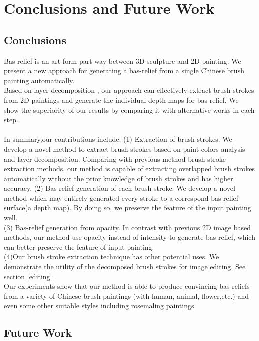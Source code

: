 \chapter{Conclusions and Future Work}
\section{Conclusions}
Bas-relief is an art form part way between 3D sculpture and 2D painting. We present a new approach for generating a bas-relief from a single Chinese brush painting automatically. \\
Based on layer decomposition , our approach can effectively extract brush strokes from 2D paintings and generate the individual depth maps for bas-relief. We show the superiority of our results by comparing it with alternative works in each step.\\ \\
In summary,our contributions include:
\newline
(1) Extraction of brush strokes. We develop a novel method to extract brush strokes based on paint colors analysis and layer decomposition.  Comparing with previous method brush stroke extraction methods, our method is capable of extracting overlapped brush strokes automatically without the prior knowledge of brush strokes and has higher accuracy. 
\newline
(2) Bas-relief generation of each brush stroke. We develop a novel method which may entirely generated every stroke to a correspond bas-relief surface(a depth map). By doing so, we preserve the feature of the input painting well.\\
(3) Bas-relief generation from opacity. In contrast with previous 2D image based methods, our method use opacity instead of intensity to generate bas-relief, which can better preserve the feature of input painting.\\ 
(4)Our brush stroke extraction technique has other potential uses. We demonstrate the utility of the decomposed brush strokes for image editing. See section \ref{editing}.\\
Our experiments show that our method is able to produce convincing bas-reliefs from a variety of Chinese brush paintings (with human, animal, flower,etc.)  and even some other suitable styles including rosemaling paintings. \\   
\section{Future Work}

